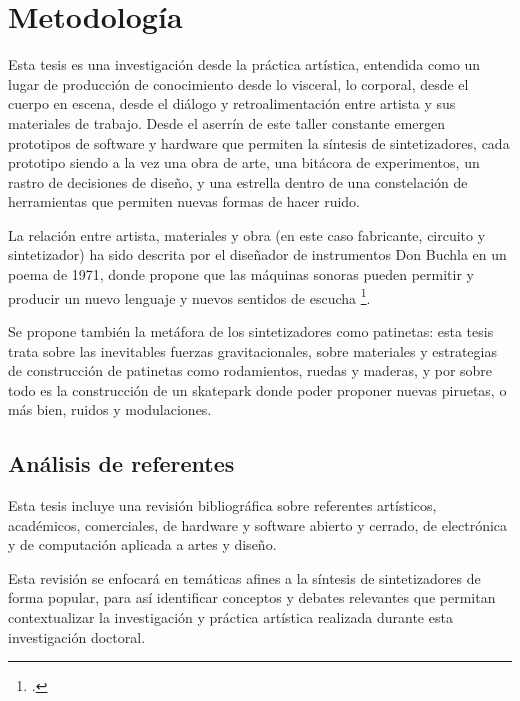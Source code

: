 \documentclass[../candidatura.tex]{subfiles}
\begin{document}
\section{Metodología}


Esta tesis es una investigación desde la práctica artística, entendida como un lugar de producción de conocimiento desde lo visceral, lo corporal, desde el cuerpo en escena, desde el diálogo y retroalimentación entre artista y sus materiales de trabajo. Desde el aserrín de este taller constante emergen prototipos de software y hardware que permiten la síntesis de sintetizadores, cada prototipo siendo a la vez una obra de arte, una bitácora de experimentos, un rastro de decisiones de diseño, y una estrella dentro de una constelación de herramientas que permiten nuevas formas de hacer ruido.

La relación entre artista, materiales y obra (en este caso fabricante, circuito y sintetizador) ha sido descrita por el diseñador de instrumentos Don Buchla en un poema de 1971, donde propone que las máquinas sonoras pueden permitir y producir un nuevo lenguaje y nuevos sentidos de escucha \footcite[88--89]{gordon_composers_2025}.

Se propone también la metáfora de los sintetizadores como patinetas: esta tesis trata sobre las inevitables fuerzas gravitacionales, sobre materiales y estrategias de construcción de patinetas como rodamientos, ruedas y maderas, y por sobre todo es la construcción de un skatepark donde poder proponer nuevas piruetas, o más bien, ruidos y modulaciones.


\subsection{Análisis de referentes}

Esta tesis incluye una revisión bibliográfica sobre referentes artísticos, académicos, comerciales, de hardware y software abierto y cerrado, de electrónica y de computación aplicada a artes y diseño.

Esta revisión se enfocará en temáticas afines a la síntesis de sintetizadores de forma popular, para así identificar conceptos y debates relevantes que permitan contextualizar la investigación y práctica artística realizada durante esta investigación doctoral.
\end{document}
